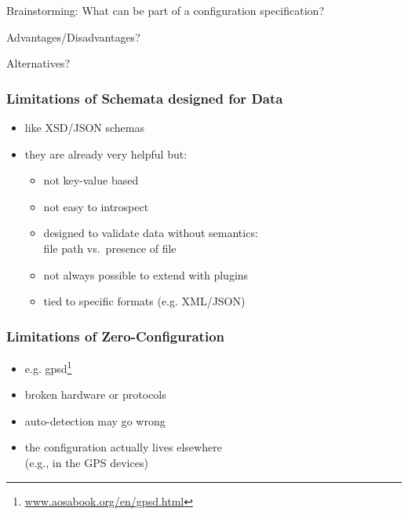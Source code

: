 \begin{assignment}
	\begin{task}
	Brainstorming: What can be part of a configuration specification?
	\end{task}

	\begin{task}
	Advantages/Disadvantages?
	\end{task}

	\begin{task}
	Alternatives?
	\end{task}
\end{assignment}

\begin{frame}
	\methodQuestion{}
\end{frame}

\begin{frame}
	\frametitle{Limitations of Schemata designed for Data}
	\begin{itemize}
	\item like XSD/JSON schemas
	\item they are already very helpful but:
	\pause
	\begin{itemize}
	\item not key-value based
	\item not easy to introspect
	\item designed to validate data without semantics: \\ file path vs.\ presence of file
	\item not always possible to extend with plugins
	\item tied to specific formats (e.g. XML/JSON)
	\end{itemize}
	\end{itemize}
\end{frame}

\begin{frame}
	\frametitle{Limitations of Zero-Configuration}
	\begin{itemize}
	\item e.g. gpsd\footnote{\url{www.aosabook.org/en/gpsd.html}}
	\pause
	\item broken hardware or protocols
	\item auto-detection may go wrong
	\item the configuration actually lives elsewhere \\ (e.g., in the GPS devices)
	\end{itemize}
\end{frame}

